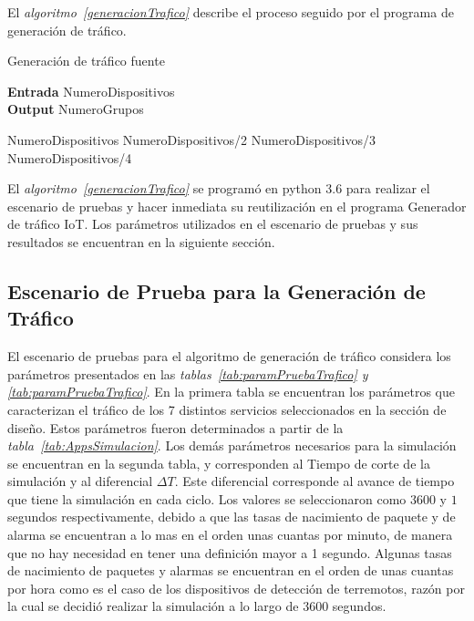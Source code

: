 El \textit{algoritmo~\ref{generacionTrafico}} describe el proceso seguido por el programa de generación de tráfico.

\begin{algorithm}
    \caption{Generación de tráfico fuente}
    \label{generacionTrafico}
    \hspace*{\algorithmicindent} \textbf{Entrada} NumeroDispositivos\\
    \hspace*{\algorithmicindent} \textbf{Output} NumeroGrupos
    \begin{algorithmic}[1]
        \Return NumeroDispositivos
        \EndIf
        \Return NumeroDispositivos/2
        \EndIf
        \Return NumeroDispositivos/3
        \EndIf
        \Return NumeroDispositivos/4
        \EndIf
        \EndIf
    \EndIf
    \EndProcedure
    \end{algorithmic}
\end{algorithm}

El \textit{algoritmo~\ref{generacionTrafico}} se programó en python 3.6 para realizar el escenario de pruebas y hacer inmediata su reutilización en el programa Generador de tráfico IoT. Los parámetros utilizados en el escenario de pruebas y sus resultados se encuentran en la siguiente sección.\newline

\subsection{Escenario de Prueba para la Generación de Tráfico}

El escenario de pruebas para el algoritmo de generación de tráfico considera los parámetros presentados en las \textit{tablas~\ref{tab:paramPruebaTrafico} y \ref{tab:paramPruebaTrafico}}.  En la primera tabla se encuentran los parámetros que caracterizan el tráfico de los 7 distintos servicios seleccionados en la sección de diseño. Estos parámetros fueron determinados a partir de la \textit{tabla~\ref{tab:AppsSimulacion}}. Los demás parámetros necesarios para la simulación se encuentran en la segunda tabla, y corresponden al Tiempo de corte de la simulación y al diferencial $\Delta T$. Este diferencial corresponde al avance de tiempo que tiene la simulación en cada ciclo. Los valores se seleccionaron como $3600$ y $1$ segundos respectivamente, debido a que las tasas de nacimiento de paquete y de alarma se encuentran a lo mas en el orden unas cuantas por minuto, de manera que no hay necesidad en tener una definición mayor a 1 segundo. Algunas tasas de nacimiento de paquetes y alarmas se encuentran en el orden de unas cuantas por hora como es el caso de los dispositivos de detección de terremotos, razón por la cual se decidió realizar la simulación a lo largo de 3600 segundos.\newline

